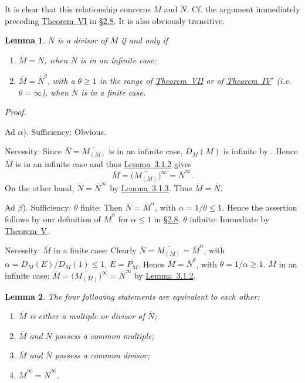 \documentclass[b5paper,twoside]{article}
\newcommand{\secref}[2]{\hyperref[#1]{\mbox{\S#2}}}
\newcommand{\thmref}[2]{\hyperref[#1]{\mbox{Theorem~#2}}}
\newcommand{\lemref}[2]{\hyperref[#1]{\mbox{Lemma~#2}}}
\theoremstyle{mvnplain}
\newtheorem{lemma}{Lemma}[section]
\renewenvironment{proof}[1][Proof]{%
  \par\addvspace{0.35\baselineskip}%
  \noindent\textit{#1.}\ \normalfont\ignorespaces
}{%
  \par\addvspace{0.35\baselineskip}%
}
\newcommand{\M}{\mathbf M}
\newcommand{\N}{\mathbf N}
\def\M{M}%
\def\N{N}%
\def\mathfrak#1{#1}%
\begin{document}
It is clear that this relationship concerns \(\overline{\M}\) and
\(\overline{\N}\). Cf. the argument immediately preceding
\thmref{thm:VI}{VI} in \secref{sec:2.8}{2.8}. It is also obviously transitive.

\begin{lemma}\label{lem:3.1.4}
\(\overline{\N}\) is a divisor of \(\overline{\M}\) if and only if
\begin{enumerate}[label={}]
\item[\(\alpha\))] \(\overline{\M}=\overline{\N}\), when \(\overline{\N}\) is in an
infinite case;
\item[\(\beta\))] \(\overline{\M}=\overline{\N}^{\theta}\), with a \(\theta\geq1\) in
the range of \thmref{thm:VII}{VII} or of \thmref{thm:IV-prime}{IV$'$}
(i.e. \(\theta=\infty\)), when \(\overline{\N}\) is in a finite case.
\end{enumerate}
\end{lemma}

\begin{proof}
Ad \(\alpha\)). Sufficiency: Obvious.

Necessity: Since
\(\overline{\N}=\overline{\M_{(\mathfrak M)}}\) is in an infinite case,
\(D_{\M}(\mathfrak M)\) is infinite by
\cite[p.~189, Lemma~11.4.3]{ref5}. Hence \(\overline{\M}\) is in an infinite
case and thus \lemref{lem:3.1.2}{3.1.2} gives
\[
  \overline{\M}
  =\bigl(\overline{\M_{(\mathfrak M)}}\bigr)^\infty
  =\overline{\N}^{\infty}.
\]
On the other hand, \(\overline{\N}=\overline{\N}^{\infty}\) by
\lemref{lem:3.1.3}{3.1.3}. Thus \(\overline{\M}=\overline{\N}\).

Ad \(\beta\)). Sufficiency: \(\theta\) finite: Then
\(\overline{\N}=\overline{\M}^{\alpha}\), with
\(\alpha=1/\theta\leq1\). Hence the assertion follows by our definition of
\(\overline{\M}^{\alpha}\) for \(\alpha\leq1\) in
\secref{sec:2.8}{2.8}. \(\theta\) infinite: Immediate by
\thmref{thm:V}{V}.

Necessity: \(\overline{\M}\) in a finite case: Clearly
\(\overline{\N}=\overline{\M_{(\mathfrak M)}}=\overline{\M}^{\alpha}\),
with \(\alpha=D_{\M}(E)/D_{\M}(1)\leq1\),
\(E=P_{\mathfrak M}\). Hence
\(\overline{\M}=\overline{\N}^{\theta}\), with
\(\theta=1/\alpha\geq1\). \(\overline{\M}\) in an infinite case:
\(\overline{\M}=\bigl(\overline{\M_{(\mathfrak M)}}\bigr)^\infty
=\overline{\N}^{\infty}\) by \lemref{lem:3.1.2}{3.1.2}.
\end{proof}

\begin{lemma}\label{lem:3.1.5}
The four following statements are equivalent to each other:
\begin{enumerate}[label={}]
\item[\(\alpha\))] \(\overline{\M}\) is either a multiple or divisor of
\(\overline{\N}\);
\item[\(\beta\))] \(\overline{\M}\) and \(\overline{\N}\) possess a common multiple;
\item[\(\gamma\))] \(\overline{\M}\) and \(\overline{\N}\) possess a common divisor;
\item[\(\delta\))] \(\overline{\M}^{\infty}=\overline{\N}^{\infty}\).
\end{enumerate}
\end{lemma}
\end{document}
